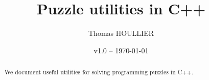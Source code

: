 \documentclass[letterpaper]{article}
\title{Puzzle utilities in C++}
\author{Thomas HOULLIER}
\begin{document}
\frenchspacing
\date{v1.0 -- \today}
\maketitle
\thispagestyle{FirstPage}

\begin{abstract}
  We document useful utilities for solving programming puzzles in C++.
\end{abstract}


\begin{versionhistory}
\end{versionhistory}
\setcounter{table}{0} %

\tableofcontents
\printglossary[type=\acronymtype,style=index]
\pagestyle{plain}



\appendix
\cleardoublepage


\apptocmd{\thebibliography}{\raggedright}{}{}
\begingroup
{}
\setlength\bibitemsep{0pt}
\printbibliography
\endgroup
\end{document}
